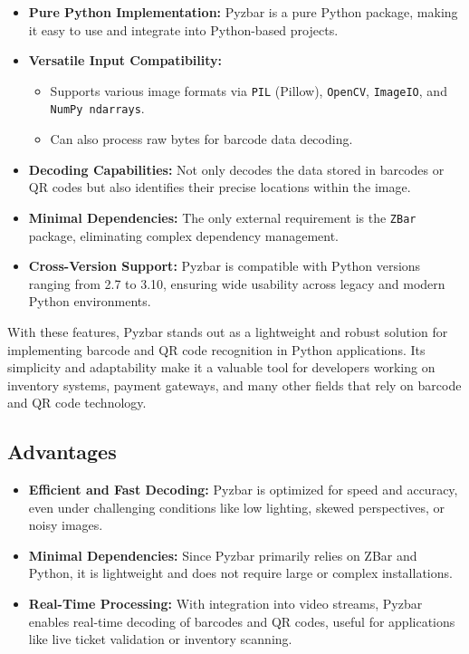 \begin{itemize}
	\item \textbf{Pure Python Implementation:} Pyzbar is a pure Python package, making it easy to use and integrate into Python-based projects.
	\item \textbf{Versatile Input Compatibility:}
	\begin{itemize}
		\item Supports various image formats via \texttt{PIL} (Pillow), \texttt{OpenCV}, \texttt{ImageIO}, and \texttt{NumPy ndarrays}.
		\item Can also process raw bytes for barcode data decoding.
	\end{itemize}
	\item \textbf{Decoding Capabilities:} Not only decodes the data stored in barcodes or QR codes but also identifies their precise locations within the image.
	\item \textbf{Minimal Dependencies:} The only external requirement is the \texttt{ZBar} package, eliminating complex dependency management.
	\item \textbf{Cross-Version Support:} Pyzbar is compatible with Python versions ranging from 2.7 to 3.10, ensuring wide usability across legacy and modern Python environments.
\end{itemize}

With these features, Pyzbar stands out as a lightweight and robust solution for implementing barcode and QR code recognition in Python applications. Its simplicity and adaptability make it a valuable tool for developers working on inventory systems, payment gateways, and many other fields that rely on barcode and QR code technology.\cite{pyzbargithub:2024}

\subsection{Advantages}

\begin{itemize}
	\item \textbf{Efficient and Fast Decoding:}  
	Pyzbar is optimized for speed and accuracy, even under challenging conditions like low lighting, skewed perspectives, or noisy images.
	
	\item \textbf{Minimal Dependencies:}  
	Since Pyzbar primarily relies on ZBar and Python, it is lightweight and does not require large or complex installations.
	
	\item \textbf{Real-Time Processing:}  
	With integration into video streams, Pyzbar enables real-time decoding of barcodes and QR codes, useful for applications like live ticket validation or inventory scanning.
\end{itemize}

